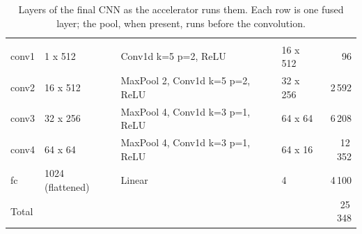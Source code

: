 \begin{table}[H]
  \centering
  \caption{Layers of the final CNN as the accelerator runs them. Each row is one fused layer; the pool, when present, runs before the convolution.}
  \label{tab:architecture}
  \begin{tabularx}{\linewidth}{llYlr}
     &  &  &  &  \\
    conv1 & 1 x 512 & Conv1d k=5 p=2, ReLU & 16 x 512 & 96 \\
    conv2 & 16 x 512 & MaxPool 2, Conv1d k=5 p=2, ReLU & 32 x 256 & 2\,592 \\
    conv3 & 32 x 256 & MaxPool 4, Conv1d k=3 p=1, ReLU & 64 x 64 & 6\,208 \\
    conv4 & 64 x 64 & MaxPool 4, Conv1d k=3 p=1, ReLU & 64 x 16 & 12\,352 \\
    fc & 1024 (flattened) & Linear & 4 & 4\,100 \\
    Total &  &  &  & 25\,348 \\
    \bottomrule
  \end{tabularx}
\end{table}

